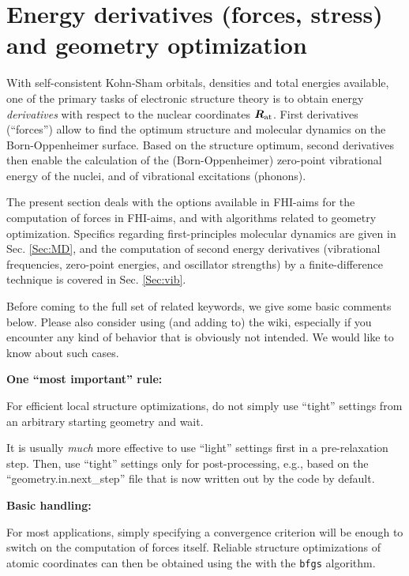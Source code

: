 \section{Energy derivatives (forces, stress) and geometry optimization}

With self-consistent Kohn-Sham orbitals, densities and total energies
available, one of the primary tasks of electronic structure theory is
to obtain energy \emph{derivatives} with respect to the nuclear
coordinates $\mbox{\boldmath$R$}_\text{at}$. First derivatives (``forces'') allow
to find the optimum structure and molecular dynamics on the
Born-Oppenheimer surface. Based on the structure optimum, second
derivatives then enable the calculation of the (Born-Oppenheimer)
zero-point vibrational energy of the nuclei, and of vibrational
excitations (phonons).

The present section deals with the options available in FHI-aims for
the computation of forces in FHI-aims, and with algorithms related to
geometry optimization. Specifics regarding first-principles molecular
dynamics are given in Sec. \ref{Sec:MD}, and the computation of second
energy derivatives (vibrational frequencies, zero-point energies, and
oscillator strengths) by a finite-difference technique is covered in 
Sec. \ref{Sec:vib}. 

Before coming to the full set of related keywords, 
we give some basic comments below. Please also consider using (and 
adding to) the wiki, especially if you encounter any kind of behavior
that is obviously not intended. We would like to know about such
cases. 

\textbf{One ``most important'' rule:}

For efficient local structure optimizations, do not simply use
``tight'' settings from an arbitrary starting geometry and wait.

It is usually \emph{much} more effective to use ``light'' settings
first in a pre-relaxation step. Then, use ``tight'' settings only for
post-processing, e.g., based on the ``geometry.in.next\_step'' file 
that is now written out by the code by default.

\textbf{Basic handling:}

For most applications, simply specifying a convergence
criterion  will be enough to switch on
the computation of forces itself. Reliable structure optimizations of
atomic coordinates can then be obtained using the
 with the \texttt{bfgs} algorithm. 

